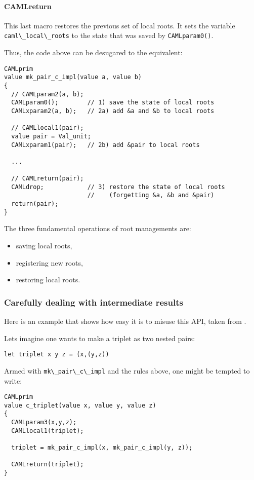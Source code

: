 \documentclass[a4paper]{easychair}
\newcommand{\cpp}[1]{\lstinline[style=C++]{#1}}
\begin{document}
\paragraph{CAMLreturn} This last macro restores the previous set of local
roots. It sets the variable \cpp{caml\_local\_roots} to the state that was
saved by \cpp{CAMLparam0()}.

Thus, the code above can be desugared to the equivalent:
%
\begin{lstlisting}[]
CAMLprim
value mk_pair_c_impl(value a, value b)
{
  // CAMLparam2(a, b);
  CAMLparam0();        // 1) save the state of local roots
  CAMLxparam2(a, b);   // 2a) add &a and &b to local roots

  // CAMLlocal1(pair);
  value pair = Val_unit;
  CAMLxparam1(pair);   // 2b) add &pair to local roots

  ...
  
  // CAMLreturn(pair);
  CAMLdrop;            // 3) restore the state of local roots
                       //    (forgetting &a, &b and &pair)
  return(pair);
}
\end{lstlisting}

The three fundamental operations of root managements are:
%
\begin{itemize}
\item saving local roots,
\item registering new roots,
\item restoring local roots.
\end{itemize}

\subsubsection{Carefully dealing with intermediate results}

Here is an example that shows how easy it is to misuse this API, taken from
\citep[caml-oxide]{camloxide}.

Lets imagine one wants to make a triplet as two nested pairs:
%
\begin{lstlisting}[]
let triplet x y z = (x,(y,z))
\end{lstlisting}

Armed with \cpp{mk\_pair\_c\_impl} and the rules above, one might 
be tempted to write:
%
\begin{lstlisting}[style=C++]
CAMLprim
value c_triplet(value x, value y, value z)
{
  CAMLparam3(x,y,z);
  CAMLlocal1(triplet);

  triplet = mk_pair_c_impl(x, mk_pair_c_impl(y, z));

  CAMLreturn(triplet);
}
\end{lstlisting}
\end{document}
